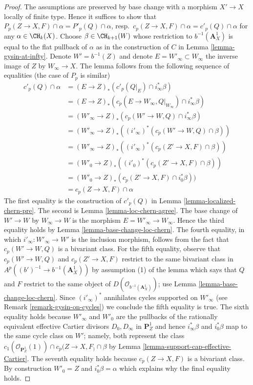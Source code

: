 \begin{proof}
The assumptions are preserved by base change with a morphism
$X' \to X$ locally of finite type. Hence it suffices to show that
$P_p(Z \to X, F) \cap \alpha = P'_p(Q) \cap \alpha$,
resp.\ $c_p(Z \to X, F) \cap \alpha = c'_p(Q) \cap \alpha$
for any $\alpha \in \CH_k(X)$. Choose $\beta \in \CH_{k + 1}(W)$
whose restriction to $b^{-1}(\mathbf{A}^1_X)$ is equal to
the flat pullback of $\alpha$ as in the construction of
$C$ in Lemma \ref{lemma-gysin-at-infty}.
Denote $W' = b^{-1}(Z)$ and denote
$E = W'_\infty \subset W_\infty$ the inverse image of $Z$
by $W_\infty \to X$.
The lemma follows from
the following sequence of equalities (the case of $P_p$ is similar)
\begin{align*}
c'_p(Q) \cap \alpha
& =
(E \to Z)_*(c'_p(Q|_E) \cap i_\infty^*\beta) \\
& =
(E \to Z)_*(c_p(E \to W_\infty, Q|_{W_\infty}) \cap i_\infty^*\beta) \\
& =
(W'_\infty \to Z)_*(c_p(W' \to W, Q) \cap i_\infty^*\beta) \\
& =
(W'_\infty \to Z)_*((i'_\infty)^*(c_p(W' \to W, Q) \cap \beta)) \\
& =
(W'_\infty \to Z)_*((i'_\infty)^*(c_p(Z' \to X, F) \cap \beta)) \\
& =
(W'_0 \to Z)_*((i'_0)^*(c_p(Z' \to X, F) \cap \beta)) \\
& =
(W'_0 \to Z)_*(c_p(Z' \to X, F) \cap i_0^*\beta)) \\
& =
c_p(Z \to X, F) \cap \alpha
\end{align*}
The first equality is the construction of $c'_p(Q)$ in
Lemma \ref{lemma-localized-chern-pre}.
The second is Lemma \ref{lemma-loc-chern-agree}.
The base change of $W' \to W$ by $W_\infty \to W$ is the
morphism $E = W'_\infty \to W_\infty$. Hence the third equality holds
by Lemma \ref{lemma-base-change-loc-chern}. The fourth
equality, in which $i'_\infty : W'_\infty \to W'$ is the
inclusion morphism, follows from the fact that $c_p(W' \to W, Q)$
is a bivariant class. For the fifth equality, observe that
$c_p(W' \to W, Q)$ and $c_p(Z' \to X, F)$
restrict to the same bivariant class in
$A^p((b')^{-1} \to b^{-1}(\mathbf{A}^1_X))$ by
assumption (1) of the lemma which says that $Q$ and $F$ restrict
to the same object of $D(\mathcal{O}_{b^{-1}(\mathbf{A}^1_X)})$;
use Lemma \ref{lemma-base-change-loc-chern}.
Since $(i'_\infty)^*$ annihilates cycles supported on $W'_\infty$
(see Remark \ref{remark-gysin-on-cycles}) we conclude the fifth equality
is true. The sixth equality holds because $W'_\infty$ and $W'_0$
are the pullbacks of the rationally equivalent effective Cartier divisors
$D_0, D_\infty$ in $\mathbf{P}^1_Z$ and hence $i_\infty^*\beta$ and
$i_0^*\beta$ map to the same cycle class on $W'$; namely, both
represent the class
$c_1(\mathcal{O}_{\mathbf{P}^1_Z}(1)) \cap c_p(Z \to X, F_) \cap \beta$ by
Lemma \ref{lemma-support-cap-effective-Cartier}.
The seventh equality holds because $c_p(Z \to X, F)$ is
a bivariant class. By construction $W'_0 = Z$ and $i_0^*\beta = \alpha$
which explains why the final equality holds.
\end{proof}







